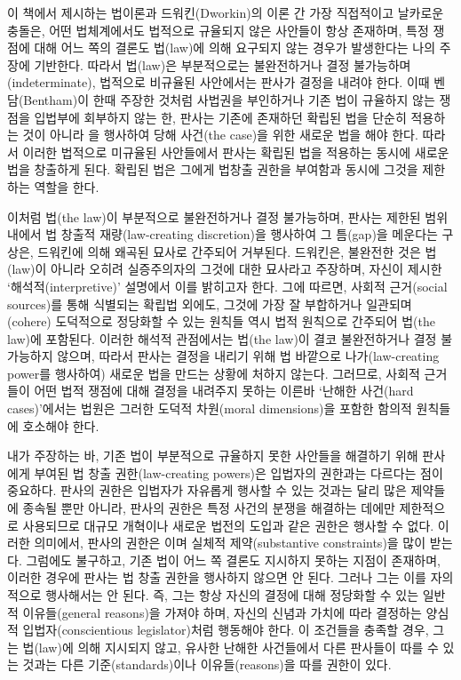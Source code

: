 이 책에서 제시하는 법이론과 드워킨(Dworkin)의 이론 간 가장 직접적이고
날카로운 충돌은, 어떤 법체계에서도 법적으로 규율되지 않은 사안들이 항상
존재하며, 특정 쟁점에 대해 어느 쪽의 결론도 법(law)에 의해 요구되지 않는
경우가 발생한다는 나의 주장에 기반한다. 따라서 법(law)은 부분적으로는
불완전하거나 결정 불가능하며(indeterminate), 법적으로 비규율된
사안에서는 판사가 결정을 내려야 한다. 이때 벤담(Bentham)이 한때 주장한
것처럼 사법권을 부인하거나 기존 법이 규율하지 않는 쟁점을 입법부에
회부하지 않는 한, 판사는 기존에 존재하던 확립된 법을 단순히 적용하는
것이 아니라 을 행사하여 당해 사건(the case)을
위한 새로운 법을 해야 한다. 따라서 이러한 법적으로
미규율된 사안들에서 판사는 확립된 법을 적용하는 동시에 새로운 법을
창출하게 된다. 확립된 법은 그에게 법창출 권한을 부여함과 동시에 그것을
제한하는 역할을 한다.

이처럼 법(the law)이 부분적으로 불완전하거나 결정 불가능하며, 판사는
제한된 범위 내에서 법 창출적 재량(law-creating discretion)을 행사하여 그
틈(gap)을 메운다는 구상은, 드워킨에 의해 왜곡된 묘사로 간주되어
거부된다. 드워킨은, 불완전한 것은 법(law)이 아니라 오히려 실증주의자의
그것에 대한 묘사라고 주장하며, 자신이 제시한 `해석적(interpretive)'
설명에서 이를 밝히고자 한다. 그에 따르면, 사회적 근거(social sources)를
통해 식별되는  확립법 외에도, 그것에 가장 잘
부합하거나 일관되며(cohere) 도덕적으로 정당화할 수 있는 원칙들 역시
 법적 원칙으로 간주되어 법(the law)에 포함된다.
이러한 해석적 관점에서는 법(the law)이 결코 불완전하거나 결정 불가능하지
않으며, 따라서 판사는 결정을 내리기 위해 법 바깥으로 나가(law-creating
power를 행사하여) 새로운 법을 만드는 상황에 처하지 않는다. 그러므로,
사회적 근거들이 어떤 법적 쟁점에 대해 결정을 내려주지 못하는 이른바
`난해한 사건(hard cases)'에서는 법원은 그러한 도덕적 차원(moral
dimensions)을 포함한 함의적 원칙들에 호소해야 한다.

내가 주장하는 바, 기존 법이 부분적으로 규율하지 못한 사안들을 해결하기
위해 판사에게 부여된 법 창출 권한(law-creating powers)은 입법자의
권한과는 다르다는 점이 중요하다. 판사의 권한은 입법자가 자유롭게 행사할
수 있는 것과는 달리  많은
제약들에 종속될 뿐만 아니라, 판사의 권한은 특정 사건의 분쟁을 해결하는
데에만 제한적으로 사용되므로 대규모 개혁이나 새로운 법전의 도입과 같은
권한은 행사할 수 없다. 이러한 의미에서, 판사의 권한은
이며 실체적 제약(substantive constraints)을
많이 받는다. 그럼에도 불구하고, 기존 법이 어느 쪽 결론도 지시하지 못하는
지점이 존재하며, 이러한 경우에 판사는 법 창출 권한을 행사하지 않으면 안
된다. 그러나 그는 이를 자의적으로 행사해서는 안 된다. 즉, 그는 항상
자신의 결정에 대해 정당화할 수 있는 일반적 이유들(general reasons)을
가져야 하며, 자신의 신념과 가치에 따라 결정하는 양심적
입법자(conscientious legislator)처럼 행동해야 한다. 이 조건들을 충족할
경우, 그는 법(law)에 의해 지시되지 않고, 유사한 난해한 사건들에서 다른
판사들이 따를 수 있는 것과는 다른 기준(standards)이나 이유들(reasons)을
따를 권한이 있다.

